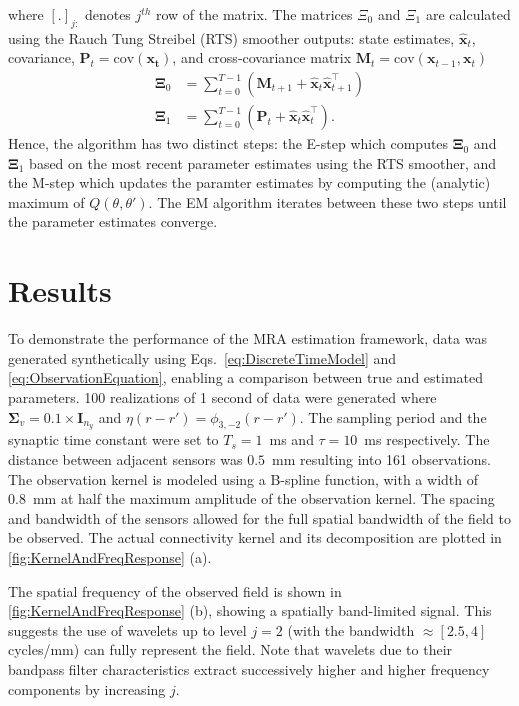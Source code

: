 \documentclass[journal,a4paper]{IEEEtran}
\newcommand{\cut}[1]{\textcolor{cyan}{#1}}
\begin{document}
where $[.]_{j:} $ denotes $j^{th}$ row of the matrix.%
The matrices $\Xi_0$ and $\Xi_1$ are calculated using the Rauch Tung Streibel (RTS)\cite{RAUCH1965} smoother outputs: state estimates, $\hat{\mathbf x}_t$, covariance, $\mathbf P_t=\mathrm{cov}(\mathbf{x_t})$, and cross-covariance matrix $\mathbf M_t=\mathrm{cov}(\mathbf{x}_{t-1},\mathbf{x}_{t})$ 
\begin{align}\label{eq:Xivariables}
\boldsymbol\Xi_0&=\sum_{t=0}^{T-1}\left(\mathbf M_{t+1}+\mathbf{\hat x}_t\mathbf{\hat x}_{t+1}^\top\right) \\
 \boldsymbol\Xi_1&=\sum_{t=0}^{T-1}\left(\mathbf P_t+\mathbf{\hat x}_t\mathbf{\hat x}_t^\top\right).
\end{align}
Hence, the algorithm has two distinct steps: the E-step which computes $\boldsymbol\Xi_0$ and $\boldsymbol\Xi_1$ based on the most recent parameter estimates using the RTS smoother, and the M-step which updates the paramter estimates by computing the (analytic) maximum of $Q(\theta,\theta')$. The EM algorithm iterates between these two steps until the parameter estimates converge. 


\section{Results}
To demonstrate the performance of the MRA estimation framework, data was generated synthetically  using Eqs.~\ref{eq:DiscreteTimeModel} and \ref{eq:ObservationEquation}, enabling a comparison between true and estimated parameters. 100 realizations of 1 second of data were generated where $\boldsymbol\Sigma_v=0.1 \times \mathbf{I}_{n_y}$ and $\eta(r-r')=\phi_{3,-2}(r-r')$. The sampling period and the synaptic time constant were set to $T_s = 1$~ms and $\tau = 10$~ms respectively. The distance between adjacent sensors was $0.5$~mm resulting into 161 observations. The observation kernel is modeled using a B-spline function, with a width of 0.8~mm at half the maximum amplitude of the observation kernel. The spacing and bandwidth of the sensors allowed for the full spatial bandwidth of the field to be observed. The actual connectivity kernel and its decomposition are plotted in \figurename{\ref{fig:KernelAndFreqResponse}} (a). 

The spatial frequency of the observed field is shown in \figurename{\ref{fig:KernelAndFreqResponse}} (b), showing a spatially band-limited signal. This suggests the use of wavelets up to level $j=2$ (with the bandwidth $\approx[2.5,4]$ cycles/mm) can fully represent the field. Note that wavelets due to their bandpass filter characteristics extract successively higher and higher frequency components by increasing $j$.
\end{document}
